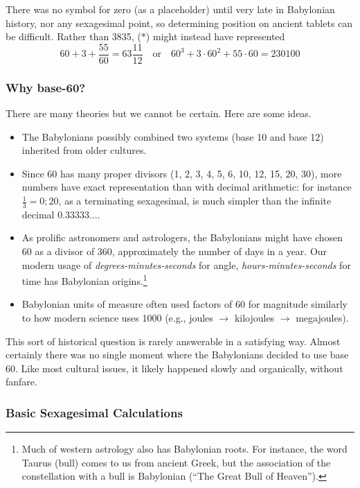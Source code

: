 There was no symbol for zero (as a placeholder) until very late in Babylonian history, nor any sexagesimal point, so determining position on ancient tablets can be difficult. Rather than 3835, ($\ast$) might instead have represented
\[
	60+3+\frac{55}{60}=63\frac{11}{12}
	\quad\text{or}\quad 
	60^3+3\cdot 60^2+55\cdot 60=230100
\]


\pagebreak[3]


\subsubsection*{Why base-60?}

There are many theories but we cannot be certain. Here are some ideas.
\begin{itemize}
  \item The Babylonians possibly combined two systems (base 10 and base 12) inherited from older cultures.
  
  \item Since 60 has many proper divisors (1, 2, 3, 4, 5, 6, 10, 12, 15, 20, 30), more numbers have exact representation than with decimal arithmetic: for instance $\frac 13=0;20$, as a terminating sexagesimal, is much simpler than the infinite decimal $0.33333\ldots$.
  
  \item As prolific astronomers and astrologers, the Babylonians might have chosen 60 as a divisor of 360, approximately the number of days in a year. Our modern usage of \emph{degrees-minutes-seconds} for angle, \emph{hours-minutes-seconds} for time has Babylonian origins.\footnote{%
  	Much of western astrology also has Babylonian roots. For instance, the word Taurus (bull) comes to us from ancient Greek, but the association of the constellation with a bull is Babylonian (``The Great Bull of Heaven'').
  }
  \item Babylonian units of measure often used factors of 60 for magnitude similarly to how modern science uses 1000 (e.g., joules $\rightarrow$ kilojoules $\rightarrow$ megajoules). 
\end{itemize}

This sort of historical question is rarely answerable in a satisfying way. Almost certainly there was no single moment where the Babylonians decided to use base 60. Like most cultural issues, it likely happened slowly and organically, without fanfare.



\subsubsection*{Basic Sexagesimal Calculations}\label{babmult}

